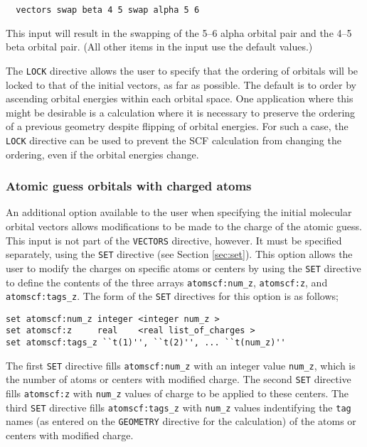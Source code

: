 \begin{verbatim}
  vectors swap beta 4 5 swap alpha 5 6
\end{verbatim}

This input will result in the swapping of the 5--6 alpha orbital pair and 
the 4--5 beta orbital pair.  (All other items in the input use the
default values.)

The \verb+LOCK+ directive allows the user to specify that the ordering of 
orbitals will be locked to that of the
initial vectors, as far as possible. The default is to order by
ascending orbital energies within each orbital space. One application
where this might be desirable is a calculation where it is necessary 
to preserve the ordering of a previous geometry despite flipping of 
orbital energies.  For such a case, the \verb+LOCK+ directive can be used
to prevent the SCF calculation from changing the ordering, even if the orbital
energies change.



\subsubsection{Atomic guess orbitals with charged atoms}

An additional option available to the user when specifying the initial
molecular orbital vectors allows modifications to be made to the charge
of the atomic guess.  This input is not part of the \verb+VECTORS+ directive,
however.  It must be specified separately, using the \verb+SET+
directive (see Section \ref{sec:set}).  This option allows the user to 
modify the charges on specific atoms or
centers by using the \verb+SET+ directive to define the contents
of the three arrays \verb+atomscf:num_z+, \verb+atomscf:z+, and
\verb+atomscf:tags_z+.  The form of the \verb+SET+ directives 
for this option is as follows;


\begin{verbatim}
set atomscf:num_z integer <integer num_z >
set atomscf:z     real    <real list_of_charges >
set atomscf:tags_z ``t(1)'', ``t(2)'', ... ``t(num_z)''
\end{verbatim}

The first \verb+SET+ directive fills \verb+atomscf:num_z+ with an
integer value \verb+num_z+, which is the number of atoms or centers 
with modified charge.
The second \verb+SET+ directive fills \verb+atomscf:z+ with \verb+num_z+
values of charge to be applied to these centers.  The third 
\verb+SET+ directive fills \verb+atomscf:tags_z+ with \verb+num_z+ values
indentifying the
\verb+tag+ names (as entered on the \verb+GEOMETRY+ directive for the
calculation) of the atoms or centers with modified charge.

